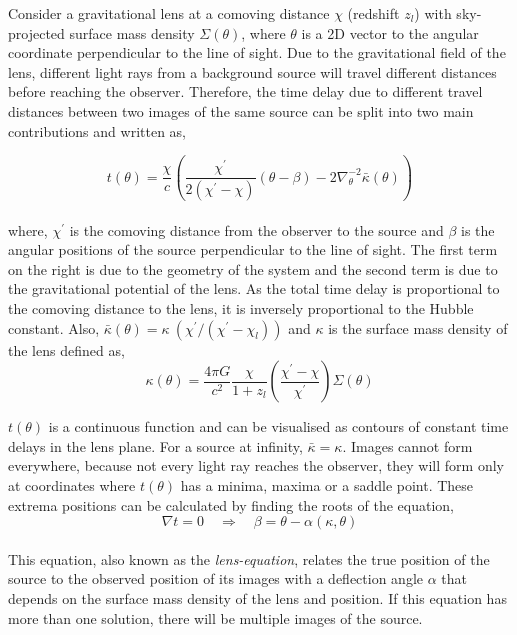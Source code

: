 \documentclass[
  11pt,
  twoside,
  openright,
  titlepage,
  headings=optiontoheadandtoc
]{scrbook}
\begin{document}
Consider a gravitational lens at a comoving distance $\chi$ (redshift $z_l$) 
with sky-projected surface
mass density $\Sigma(\theta)$, where $\theta$ is a 2D vector to the
angular coordinate perpendicular to the line of sight. Due to the 
gravitational field of the lens, different light rays from a background source
will travel different distances before reaching the observer. Therefore, the time delay
due to different travel distances between two images of the same source can be
split into two main contributions and written as,

\begin{equation}
	t(\theta) = \dfrac{\chi}{c} \left( \dfrac{\chi^{\prime}}{2(\chi^{\prime}-\chi)} 
				(\theta-\beta) 
				- 2\nabla_{\theta}^{-2} \bar{\kappa}(\theta) \right)
	\label{eqn:timedelay}
\end{equation}
\\
where, $\chi^{\prime}$ is the comoving distance from the observer
to the source and $\beta$ is 
the angular positions of the source perpendicular to the line of sight.
The first term on the right is due to the geometry of the system
and the second term is due to the gravitational potential of the lens.
As the total time delay is proportional to the comoving distance
to the lens, it is inversely proportional to the Hubble constant. 
Also, $\bar{\kappa}(\theta) = \kappa\ (\chi^{\prime}/(\chi^{\prime}-\chi_l))$ and
$\kappa$ is the surface mass density of the lens defined as,
\begin{equation}
	\kappa(\theta) = \dfrac{4\pi G}{c^2} \dfrac{\chi}{1+z_l}
					  \left(\dfrac{\chi^{\prime}-\chi}{\chi^{\prime}}\right) \Sigma(\theta)
\end{equation}

$t(\theta)$ is a continuous function and can be visualised as contours
of constant time delays in the lens plane. For a source at infinity,
$\bar{\kappa}=\kappa$.
Images cannot form everywhere, because not every light
ray reaches the observer, they will form only at coordinates where $t(\theta)$
has a minima, maxima or a saddle point. These extrema positions can 
be calculated by finding the roots of the equation,
\begin{equation}
	\nabla t = 0 \quad \Rightarrow \quad \beta = \theta - \alpha(\kappa,\theta)
\end{equation}
\\
This equation, also known as the {\it lens-equation}, relates the true 
position of the source to the observed position of its images with
a deflection angle $\alpha$ that depends on the surface mass density
of the lens and position. If this equation has more than one solution,
there will be multiple images of the source.
\end{document}
